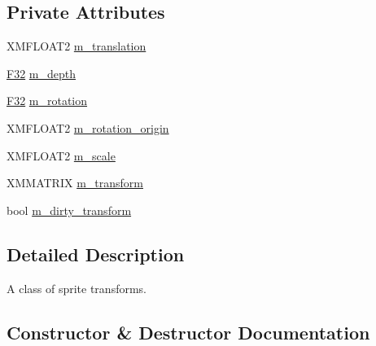 \subsection*{Private Attributes}
\begin{DoxyCompactItemize}
\item 
X\+M\+F\+L\+O\+A\+T2 \hyperlink{classmage_1_1_sprite_transform_a7642907ec8ae9685bb7c56675607045b}{m\+\_\+translation}
\item 
\hyperlink{namespacemage_aa97e833b45f06d60a0a9c4fc22ae02c0}{F32} \hyperlink{classmage_1_1_sprite_transform_a646e129b2e9702eec23b4c673f07dfef}{m\+\_\+depth}
\item 
\hyperlink{namespacemage_aa97e833b45f06d60a0a9c4fc22ae02c0}{F32} \hyperlink{classmage_1_1_sprite_transform_a7c705543e7f6a9c7e7a517ffef2cb4b9}{m\+\_\+rotation}
\item 
X\+M\+F\+L\+O\+A\+T2 \hyperlink{classmage_1_1_sprite_transform_ae51ebd0226ef4b569b6a66884823bd18}{m\+\_\+rotation\+\_\+origin}
\item 
X\+M\+F\+L\+O\+A\+T2 \hyperlink{classmage_1_1_sprite_transform_a7532d4d41d02b5fa6f31eeb4fd4fd886}{m\+\_\+scale}
\item 
X\+M\+M\+A\+T\+R\+IX \hyperlink{classmage_1_1_sprite_transform_ad2fec50a82772514da9399ff31703f3d}{m\+\_\+transform}
\item 
bool \hyperlink{classmage_1_1_sprite_transform_a3072ed606f16d14d16cdad46438e9cf3}{m\+\_\+dirty\+\_\+transform}
\end{DoxyCompactItemize}


\subsection{Detailed Description}
A class of sprite transforms. 

\subsection{Constructor \& Destructor Documentation}
\hypertarget{classmage_1_1_sprite_transform_aeffbb76031558a370d653aaed8c00770}{}\label{classmage_1_1_sprite_transform_aeffbb76031558a370d653aaed8c00770} 

